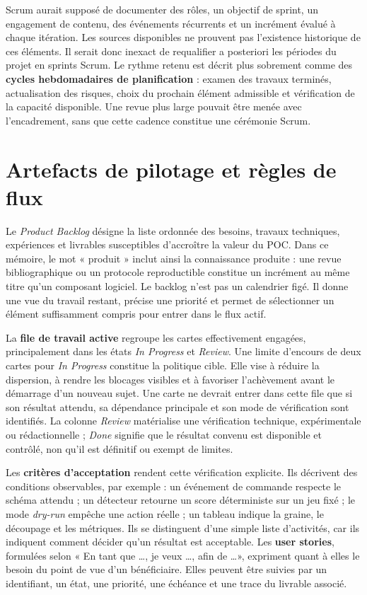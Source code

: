 \documentclass[11pt,a4paper,oneside]{report}
\theoremstyle{definition}
\theoremstyle{plain}
\begin{document}
Scrum aurait supposé de documenter des rôles, un objectif de sprint, un
engagement de contenu, des événements récurrents et un incrément évalué à chaque
itération. Les sources disponibles ne prouvent pas l'existence historique de
ces éléments. Il serait donc inexact de requalifier a posteriori les périodes
du projet en sprints Scrum. Le rythme retenu est décrit plus sobrement comme
des \textbf{cycles hebdomadaires de planification} : examen des travaux
terminés, actualisation des risques, choix du prochain élément admissible et
vérification de la capacité disponible. Une revue plus large pouvait être
menée avec l'encadrement, sans que cette cadence constitue une cérémonie Scrum.

\section{Artefacts de pilotage et règles de flux}

Le \emph{Product Backlog} désigne la liste ordonnée des besoins, travaux
techniques, expériences et livrables susceptibles d'accroître la valeur du POC.
Dans ce mémoire, le mot « produit » inclut ainsi la connaissance produite :
une revue bibliographique ou un protocole reproductible constitue un incrément
au même titre qu'un composant logiciel. Le backlog n'est pas un calendrier
figé. Il donne une vue du travail restant, précise une priorité et permet de
sélectionner un élément suffisamment compris pour entrer dans le flux actif.

La \textbf{file de travail active} regroupe les cartes effectivement engagées,
principalement dans les états \emph{In Progress} et \emph{Review}. Une limite
d'encours de deux cartes pour \emph{In Progress} constitue la politique cible.
Elle vise à réduire la dispersion, à rendre les blocages visibles et à favoriser
l'achèvement avant le démarrage d'un nouveau sujet. Une carte ne devrait entrer
dans cette file que si son résultat attendu, sa dépendance principale et son
mode de vérification sont identifiés. La colonne \emph{Review} matérialise une
vérification technique, expérimentale ou rédactionnelle ; \emph{Done} signifie
que le résultat convenu est disponible et contrôlé, non qu'il est définitif ou
exempt de limites.

Les \textbf{critères d'acceptation} rendent cette vérification explicite. Ils
décrivent des conditions observables, par exemple : un événement de commande
respecte le schéma attendu ; un détecteur retourne un score déterministe sur un
jeu fixé ; le mode \emph{dry-run} empêche une action réelle ; un tableau indique
la graine, le découpage et les métriques. Ils se distinguent d'une simple liste
d'activités, car ils indiquent comment décider qu'un résultat est acceptable.
Les \textbf{user stories}, formulées selon « En tant que \ldots, je veux
\ldots, afin de \ldots », expriment quant à elles le besoin du point de vue
d'un bénéficiaire. Elles peuvent être suivies par un identifiant, un état, une
priorité, une échéance et une trace du livrable associé.
\end{document}
